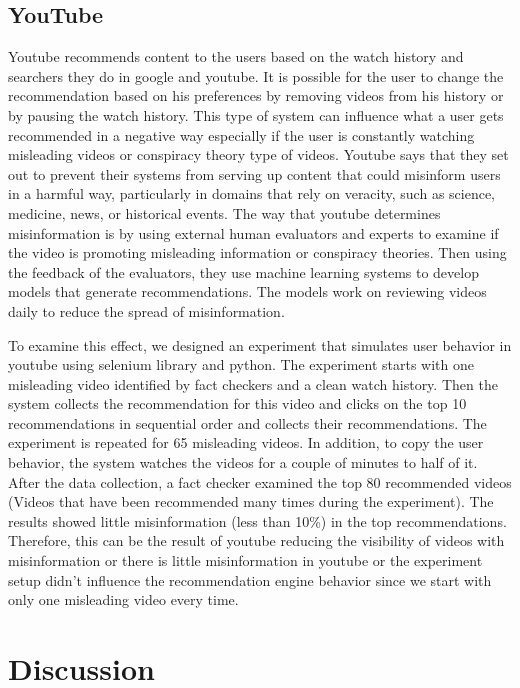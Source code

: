 \documentclass{article}
\begin{document}
\subsection{YouTube}

{\color{pink} 

Youtube recommends content to the users based on the watch history and searchers they do in google and youtube. It is possible for the user to change the recommendation based on his preferences by removing videos from his history or by pausing the watch history. This type of system can influence what a user gets recommended in a negative way especially if the user is constantly watching misleading videos or conspiracy theory type of videos.  Youtube says that they set out to prevent their systems from serving up content that could misinform users in a harmful way, particularly in domains that rely on veracity, such as science, medicine, news, or historical events.  The way that youtube determines misinformation is by using external human evaluators and experts to examine if the video is promoting misleading information or conspiracy theories. Then using the feedback of the evaluators, they use machine learning systems to develop models that generate recommendations. The models work on reviewing videos daily to reduce the spread of misinformation. 

\smallskip

To examine this effect, we designed an experiment that simulates user behavior in youtube using selenium library and python. The experiment starts with one misleading video identified by fact checkers and a clean watch history. Then the system collects the recommendation for this video and clicks on the top 10 recommendations in sequential order and collects their recommendations. The experiment is repeated for 65 misleading videos. In addition, to copy the user behavior, the system watches the videos for a couple of minutes to half of it. After the data collection, a fact checker examined the top 80 recommended videos (Videos that have been recommended many times during the experiment). The results showed little misinformation (less than 10\%) in the top recommendations. Therefore, this can be the result of youtube reducing the visibility of videos with misinformation or there is little misinformation in youtube or the experiment setup didn’t influence the recommendation engine behavior since we start with only one misleading video every time. 

}

\section{Discussion}
\end{document}
